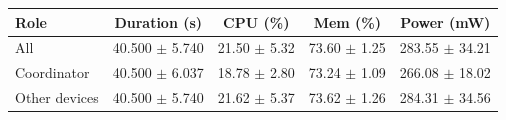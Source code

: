 \begin{tabular}{lcccc}
\hline
\textbf{Role} & \textbf{Duration (s)} & \textbf{CPU (\%)} & \textbf{Mem (\%)} & \textbf{Power (mW)} \\
\hline
All & 40.500 $\pm$ 5.740 & 21.50 $\pm$ 5.32 & 73.60 $\pm$ 1.25 & 283.55 $\pm$ 34.21 \\
Coordinator & 40.500 $\pm$ 6.037 & 18.78 $\pm$ 2.80 & 73.24 $\pm$ 1.09 & 266.08 $\pm$ 18.02 \\
Other devices & 40.500 $\pm$ 5.740 & 21.62 $\pm$ 5.37 & 73.62 $\pm$ 1.26 & 284.31 $\pm$ 34.56 \\
\hline
\end{tabular}
